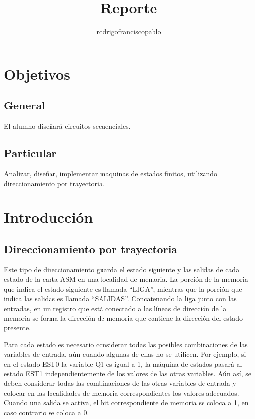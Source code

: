 \documentclass{mylib/reporteConCalif}
\title{Reporte}
\author{rodrigofranciscopablo }
\begin{document}
\coverPage

\section{Objetivos}

\subsection{General}

El alumno diseñará circuitos secuenciales.

\subsection{Particular}

Analizar, diseñar, implementar maquinas de estados finitos, utilizando direccionamiento por
trayectoria.

\section{Introducción}

\subsection{Direccionamiento por trayectoria}

Este tipo de direccionamiento guarda el estado siguiente y las salidas de cada
estado de la carta ASM en una localidad de memoria. La porción de la memoria
que indica el estado siguiente es llamada “LIGA”, mientras que la porción que
indica las salidas es llamada “SALIDAS”. Concatenando la liga junto con las
entradas, en un registro que está conectado a las líneas de dirección de la
memoria se forma la dirección de memoria que contiene la dirección del estado
presente.


Para cada estado es necesario considerar todas las posibles combinaciones de las
variables de entrada, aún cuando algunas de ellas no se utilicen. Por ejemplo, si en
el estado EST0 la variable Q1 es igual a 1, la máquina de estados pasará al estado
EST1 independientemente de los valores de las otras variables. Aún así, se deben
considerar todas las combinaciones de las otras variables de entrada y colocar en las
localidades de memoria correspondientes los valores adecuados.
Cuando una salida se activa, el bit correspondiente de memoria se coloca a 1, en
caso contrario se coloca a 0.
\end{document}
